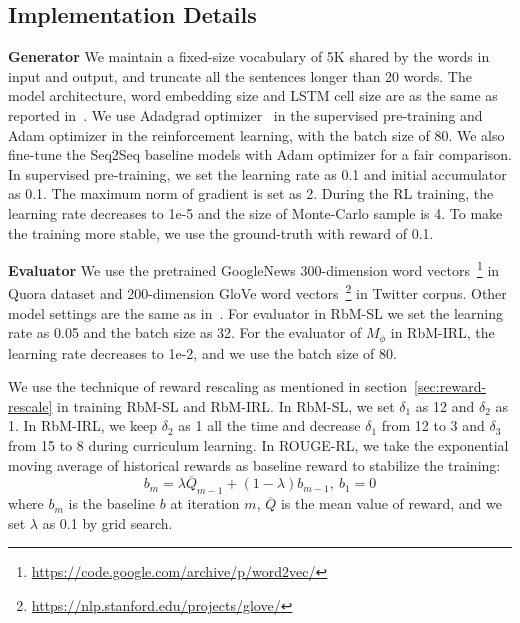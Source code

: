 \documentclass[11pt,a4paper]{article}
\newcommand{\MP}{M_{\phi}}
\begin{document}
    \subsection{Implementation Details}
    \noindent \textbf{Generator} We maintain a fixed-size vocabulary of 5K shared by the words in input and output, and truncate all the sentences longer than 20 words. The model architecture, word embedding size and LSTM cell size are as the same as reported in~\citet{see2017get}.
    We use Adadgrad optimizer~\citep{duchi2011adaptive} in the supervised pre-training and Adam optimizer in the reinforcement learning, with the batch size of 80. We also fine-tune the Seq2Seq baseline models with Adam optimizer for a fair comparison. In supervised pre-training, we set the learning rate as 0.1 and initial accumulator as 0.1. The maximum norm of gradient is set as 2. During the RL training, the learning rate decreases to 1e-5 and the size of Monte-Carlo sample is 4. To make the training more stable, we use the ground-truth with reward of 0.1.

    \noindent \textbf{Evaluator} We use the pretrained GoogleNews 300-dimension word vectors~\footnote{\url{https://code.google.com/archive/p/word2vec/}} in Quora dataset and 200-dimension GloVe word vectors~\footnote{\url{https://nlp.stanford.edu/projects/glove/}} in Twitter corpus. Other model settings are the same as in~\citet{parikh2016decomposable}. For evaluator in RbM-SL we set the learning rate as 0.05 and the batch size as 32.  For the evaluator of $\MP$ in RbM-IRL, the learning rate decreases to 1e-2, and we use the batch size of 80.

    We use the technique of reward rescaling as mentioned in section~\ref{sec:reward-rescale} in training RbM-SL and RbM-IRL. In RbM-SL, we set $\delta_{1}$ as 12 and $\delta_{2}$ as 1. In RbM-IRL, we keep $\delta_{2}$ as 1 all the time and decrease $\delta_{1}$ from 12 to 3 and $\delta_{3}$ from 15 to 8 during curriculum learning. In ROUGE-RL, we take the exponential moving average of historical rewards as baseline reward to stabilize the training:
    \[
        b_{m} = \lambda \overline{Q}_{m-1} + (1-\lambda) b_{m-1},\ b_1=0
    \]
    where $b_{m}$ is the baseline $b$ at iteration $m$, $\overline{Q}$ is the mean value of reward, and we set $\lambda$ as 0.1 by grid search.
\end{document}
